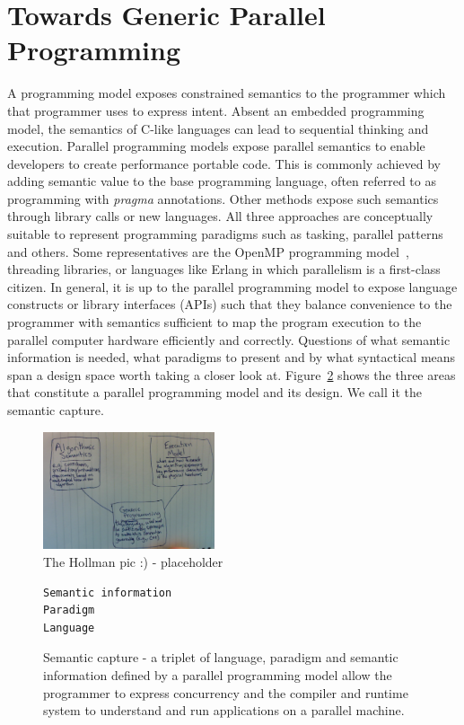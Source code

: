 \section{Towards Generic Parallel Programming}\label{chap:background}

A programming model exposes constrained semantics to the programmer which that programmer uses to express intent. Absent an embedded programming model, the semantics of C-like languages can lead to sequential thinking and execution. Parallel programming models expose parallel semantics to enable developers to create performance portable code. This is commonly achieved by adding semantic value to the base programming language, often referred to as programming with \emph{pragma} annotations. Other methods expose such semantics through library calls or new languages. All three approaches are conceptually suitable to represent programming paradigms such as tasking, parallel patterns and others. Some representatives are the OpenMP programming model~\cite{CITEOPENMP}, threading libraries, or languages like Erlang in which parallelism is a first-class citizen. In general, it is up to the parallel programming model to expose language constructs or library interfaces (APIs) such that they balance convenience to the programmer with semantics sufficient to map the program execution to the parallel computer hardware efficiently and correctly. Questions of what semantic information is needed, what paradigms to present and by what syntactical means span a design space worth taking a closer look at. Figure~\ref{figSemCapture} shows the three areas that constitute a parallel programming model and its design. We call it the semantic capture.

\begin{figure}
\centerline{\includegraphics[width=0.45\textwidth]{img/Hollman.png}}
\caption{The Hollman pic :) - placeholder}
\label{fig}
\end{figure}

\begin{figure}[h]
\begin{Verbatim}[frame=leftline]
Semantic information
Paradigm 
Language
\end{Verbatim}
\caption{Semantic capture - a triplet of language, paradigm and semantic information defined by a parallel programming model allow the programmer to express concurrency and the compiler and runtime system to understand and run applications on a parallel machine.}
\label{figSemCapture}
\end{figure}

